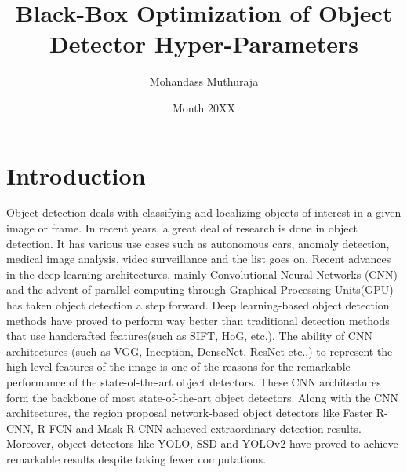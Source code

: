 \documentclass[thesis]{mas_proposal}
\title{Black-Box Optimization of Object Detector Hyper-Parameters}
\author{Mohandass Muthuraja}
\date{Month 20XX}
\begin{document}
\maketitle

\pagestyle{plain}

\section{Introduction}
Object detection deals with classifying and localizing objects of interest in a given image or frame. In recent years, a great deal of research is done in object detection. It has various use cases such as autonomous cars, anomaly detection, medical image analysis, video surveillance and the list goes on. Recent advances in the deep learning architectures, mainly Convolutional Neural Networks (CNN) and the advent of parallel computing through Graphical Processing Units(GPU) has taken object detection a step forward. Deep learning-based object detection methods have proved to perform way better than traditional detection methods that use handcrafted features(such as SIFT\cite{lowe2004distinctive}, HoG\cite{dalal2005histograms}, etc.)\cite{zou2019object}. The ability of CNN architectures (such as VGG\cite{simonyan2014very}, Inception\cite{szegedy2015going}, DenseNet\cite{huang2017densely}, ResNet\cite{he2016deep} etc.,) to represent the high-level features of the image is one of the reasons for the remarkable performance of the state-of-the-art object detectors. These CNN architectures form the backbone of most state-of-the-art object detectors. Along with the CNN architectures, the region proposal network-based object detectors like Faster R-CNN\cite{ren2015faster}, R-FCN\cite{dai2016r} and  Mask R-CNN\cite{he2017mask} achieved extraordinary detection results. Moreover, object detectors like YOLO\cite{redmon2016you}, SSD\cite{liu2016ssd} and YOLOv2\cite{redmon2017yolo9000}  have proved to achieve remarkable results despite taking fewer computations\cite{zhao2019object}. 
\end{document}
